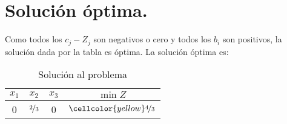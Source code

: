 \documentclass[letter]{article}
\begin{document}
    \section*{Solución óptima.}

    Como todos los $c_j - Z_j$ son negativos o cero y todos los $b_i$ son positivos, la solución dada por la tabla es óptima. La solución óptima es:    
    

    \begin{table}[h]
      \caption{Solución al problema}
\centering
   \begin{tabular}{cccc}
     $x_1$&$x_2$&$x_3$& $\min Z$\\
     \midrule
     0&$\nicefrac{2}{3}$&0& $\cellcolor{yellow}\nicefrac{4}{3}$
   \end{tabular}
 \end{table}
 
    
\end{document}
